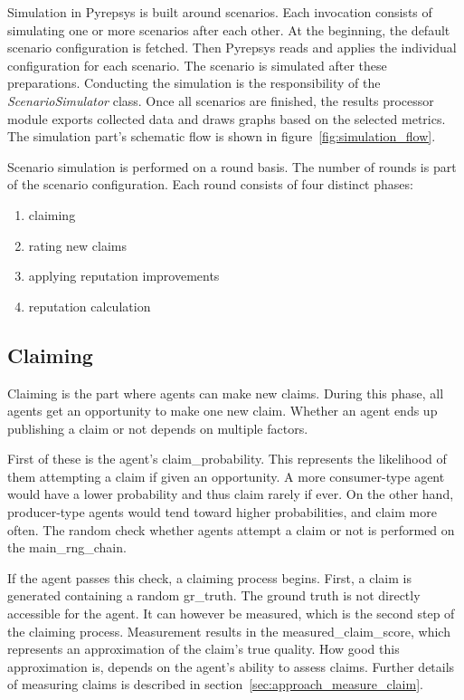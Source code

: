 \documentclass[%
    ]{\PathToTumTemplate/thesis/tum_thesis}
\begin{document}
Simulation in Pyrepsys is built around \glspl{scenario}.
Each invocation consists of simulating one or more scenarios after each other.
At the beginning, the default scenario configuration is fetched.
Then Pyrepsys reads and applies the individual configuration for each scenario.
The scenario is simulated after these preparations.
Conducting the simulation is the responsibility of the \emph{ScenarioSimulator} class.
Once all scenarios are finished, the results processor module exports collected data and draws graphs based on the selected metrics.
The simulation part's schematic flow is shown in figure~\ref{fig:simulation_flow}.

Scenario simulation is performed on a round basis.
The number of rounds is part of the scenario configuration.
Each round consists of four distinct phases:

\begin{enumerate}
	\item claiming
	\item rating new claims
	\item applying reputation improvements
	\item reputation calculation
\end{enumerate}

\subsection{Claiming}
Claiming is the part where agents can make new \glspl{claim}.
During this phase, all agents get an opportunity to make one new claim.
Whether an agent ends up publishing a claim or not depends on multiple factors.

First of these is the agent's \gls{claim_probability}.
This represents the likelihood of them attempting a claim if given an opportunity.
A more consumer-type agent would have a lower probability and thus claim rarely if ever.
On the other hand, producer-type agents would tend toward higher probabilities, and claim more often.
The random check whether agents attempt a claim or not is performed on the \gls{main_rng_chain}.

If the agent passes this check, a claiming process begins.
First, a claim is generated containing a random \gls{gr_truth}. 
The ground truth is not directly accessible for the agent.
It can however be measured, which is the second step of the claiming process.
Measurement results in the \gls{measured_claim_score}, which represents an approximation of the claim's true quality.
How good this approximation is, depends on the agent's ability to assess claims.
Further details of measuring claims is described in section~\ref{sec:approach_measure_claim}.
\end{document}

